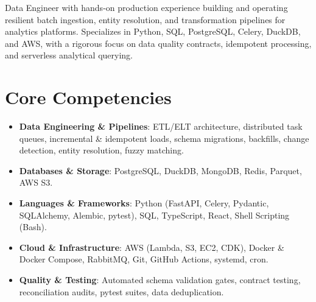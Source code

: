 \documentclass[11pt,a4paper,sans]{moderncv}
\begin{document}
\makecvtitle


\vspace{-6pt}
\small{Data Engineer with hands-on production experience building and operating resilient batch ingestion, entity resolution, and transformation pipelines for analytics platforms. Specializes in Python, SQL, PostgreSQL, Celery, DuckDB, and AWS, with a rigorous focus on data quality contracts, idempotent processing, and serverless analytical querying.}


\section{Core Competencies}
\vspace{1pt}
\begin{itemize}
\item \textbf{Data Engineering \& Pipelines}: ETL/ELT architecture, distributed task queues, incremental \& idempotent loads, schema migrations, backfills, change detection, entity resolution, fuzzy matching.
\item \textbf{Databases \& Storage}: PostgreSQL, DuckDB, MongoDB, Redis, Parquet, AWS S3.
\item \textbf{Languages \& Frameworks}: Python (FastAPI, Celery, Pydantic, SQLAlchemy, Alembic, pytest), SQL, TypeScript, React, Shell Scripting (Bash).
\item \textbf{Cloud \& Infrastructure}: AWS (Lambda, S3, EC2, CDK), Docker \& Docker Compose, RabbitMQ, Git, GitHub Actions, systemd, cron.
\item \textbf{Quality \& Testing}: Automated schema validation gates, contract testing, reconciliation audits, pytest suites, data deduplication.
\end{itemize}

\end{document}
